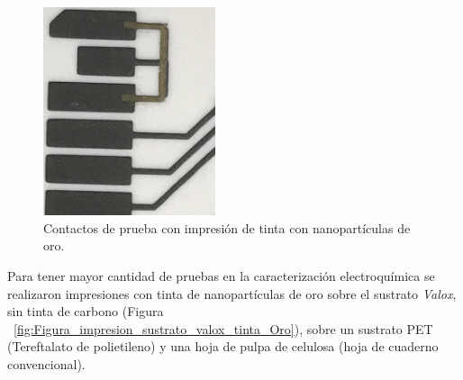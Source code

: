 \begin{figure}[H]
  \centering
    \includegraphics[width=0.45\textwidth]{Figuras/Figura_contactos_prueba_con_Oro}
  \caption{Contactos de prueba con impresión de tinta con nanopartículas de oro.}
  \label{fig:Figura_contactos_prueba_con_Oro}
\end{figure}

Para tener mayor cantidad de pruebas en la caracterización electroquímica se realizaron impresiones con tinta de nanopartículas de oro sobre el sustrato \textit{Valox}, sin tinta de carbono (Figura ~\ref{fig:Figura_impresion_sustrato_valox_tinta_Oro}), sobre un sustrato PET (Tereftalato de polietileno) y una hoja de pulpa de celulosa (hoja de cuaderno convencional).

